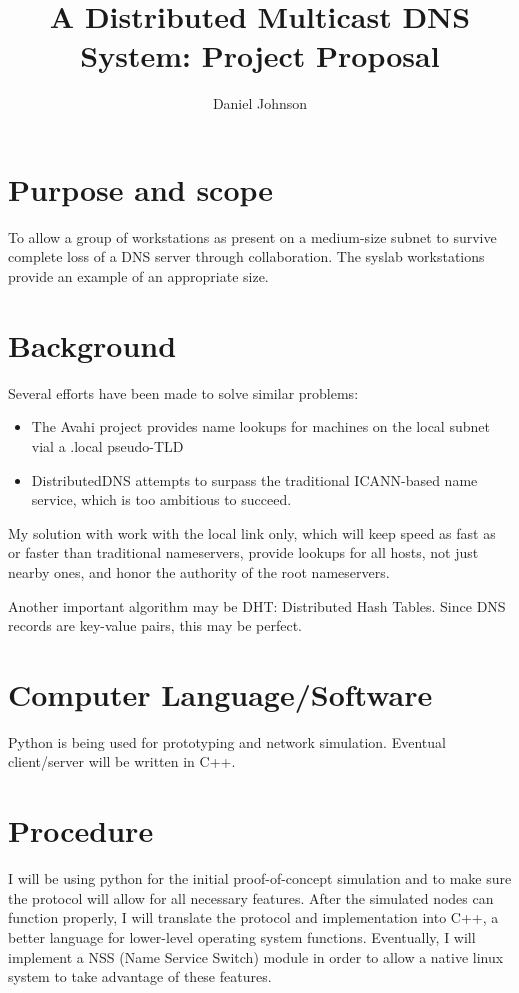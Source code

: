 \documentclass[12pt,letterpaper]{article}
\begin{document}
\author{Daniel Johnson}
\title{A Distributed Multicast DNS System: Project Proposal}
\maketitle
\section{Purpose and scope}
To allow a group of workstations as present on a medium-size subnet to survive complete loss of a DNS server through collaboration. The syslab workstations provide an example of an appropriate size.
\section{Background}
Several efforts have been made to solve similar problems:
\begin{itemize}
\item The Avahi project provides name lookups for machines on the local subnet vial a .local pseudo-TLD
\item DistributedDNS attempts to surpass the traditional ICANN-based name service, which is too ambitious to succeed.
\end{itemize}
My solution with work with the local link only, which will keep speed as fast as or faster than traditional nameservers, provide lookups for all hosts, not just nearby ones, and honor the authority of the root nameservers.

Another important algorithm may be DHT: Distributed Hash Tables. Since DNS records are key-value pairs, this may be perfect.
\section{Computer Language/Software}
Python is being used for prototyping and network simulation. Eventual client/server will be written in C++.
\section{Procedure}
I will be using python for the initial proof-of-concept simulation and to make sure the protocol will allow for all necessary features. After the simulated nodes can function properly, I will translate the protocol and implementation into C++, a better language for lower-level operating system functions. Eventually, I will implement a NSS (Name Service Switch) module in order to allow a native linux system to take advantage of these features.
\end{document}
